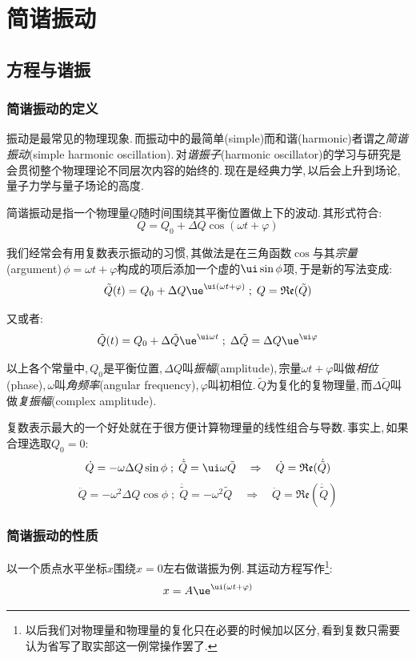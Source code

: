 \chapter{简谐振动}


\section{方程与谐振}

\subsection{简谐振动的定义}
振动是最常见的物理现象.\,而振动中的最简单(simple)而和谐(harmonic)者谓之\emph{简谐振动}(simple harmonic oscillation).\,对\emph{谐振子}(harmonic oscillator)的学习与研究是会贯彻整个物理理论不同层次内容的始终的.\,现在是经典力学,\,以后会上升到场论,\, 量子力学与量子场论的高度.

简谐振动是指一个物理量$Q$随时间围绕其平衡位置做上下的波动.\,其形式符合:
\[Q=Q_0+\Delta Q\cos(\omega t+\varphi)\]

我们经常会有用复数表示振动的习惯,\,其做法是在三角函数$\cos$与其\emph{宗量}(argument)\,$\phi=\omega t+\varphi$构成的项后添加一个虚的$\ui \sin\phi$项,\,于是新的写法变成:
\[\tilde{Q}(t)=Q_0+\Delta Q\ue^{\ui(\omega t+\varphi)}\; ; \; Q=\mathfrak{Re}(\tilde{Q})\]

又或者:
\[\tilde{Q}(t)=Q_0+\Delta \tilde{Q}\ue^{\ui\omega t}\; ; \; \Delta \tilde{Q}=\Delta Q\ue^{\ui\varphi}\]

以上各个常量中,\,$Q_0$是平衡位置,\,$\Delta Q$叫\emph{振幅}(amplitude),\,宗量$\omega t+\varphi$叫做\emph{相位}(phase),\,$\omega$叫\emph{角频率}(angular frequency),\,$\varphi$叫初相位.\,$\tilde{Q}$为复化的复物理量,\,而$\Delta \tilde{Q}$叫做\emph{复振幅}(complex amplitude).

复数表示最大的一个好处就在于很方便计算物理量的线性组合与导数.\,事实上,\,如果合理选取$Q_0=0$:
\[\dot{Q}=-\omega\Delta Q\sin\phi\; ; \; \dot{\tilde{Q}}=\ui\omega\tilde{Q}\quad \Rightarrow\quad \dot{Q}=\mathfrak{Re}(\dot{\tilde{Q}})\]
\[\ddot{Q}=-\omega^2\Delta Q\cos\phi\; ; \; \ddot{\tilde{Q}}=-\omega^2\tilde{Q}\quad \Rightarrow\quad \ddot{Q}=\mathfrak{Re}(\ddot{\tilde{Q}})\]

\subsection{简谐振动的性质}
以一个质点水平坐标$x$围绕$x=0$左右做谐振为例.\,其运动方程写作\footnote{以后我们对物理量和物理量的复化只在必要的时候加以区分,\,看到复数只需要认为省写了取实部这一例常操作罢了.}:
\[x=A\ue^{\ui(\omega t+\varphi)}\]


